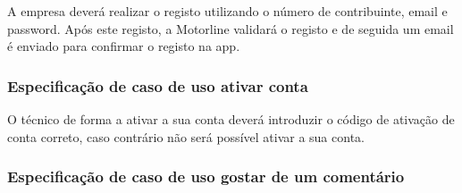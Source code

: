 A empresa deverá realizar o registo utilizando o número de contribuinte, email e password. Após este 
registo, a Motorline validará o registo e de seguida um email é enviado para confirmar o registo na app.





% 

\subsubsection{Especificação de caso de uso ativar conta}

O técnico de forma a ativar a sua conta deverá introduzir o código de ativação de conta correto, 
caso contrário não será possível ativar a sua conta.



\newpage



% 




% 


\subsubsection{Especificação de caso de uso gostar de um comentário}


